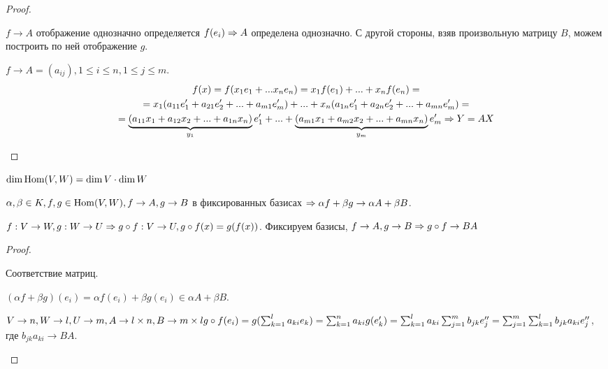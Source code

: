 \begin{proof}
	\begin{MyList}
		\item $f \to A$ отображение однозначно определяется $f(e_i) \Rightarrow A$ определена однозначно.
		С другой стороны, взяв произвольную матрицу $B$, можем построить по ней отображение $g$.

		\item $f \to A = (a_{ij}), 1 \leqslant i \leqslant n, 1 \leqslant j \leqslant m$.
		\begin{gather*}
			f(x) = f(x_1 e_1 + ... x_n e_n) = x_1 f(e_1) + ... + x_n f(e_n) = \\
			= x_1 (a_{11} e_1' + a_{21} e_2' + ... + a_{m1} e_m') + ... + x_n (a_{1n} e_1' + a_{2n} e_2' + ... + a_{mn} e_m') = \\
			= \underbrace{(a_{11} x_1 + a_{12} x_2 + ... + a_{1n} x_n)}_{y_1} e_1' + ... + \underbrace{(a_{m1} x_1 + a_{m2} x_2 + ... + a_{mn} x_n)}_{y_m} e_m' \Rightarrow Y = AX
		\end{gather*}
	\end{MyList}
\end{proof}

\begin{Cons}
	\begin{MyList}
		\item $\dim \operatorname{Hom}(V, W) = \dim V \cdot \dim W$
		\item $\alpha, \beta \in K, f, g \in \operatorname{Hom}(V, W), f \to A, g \to B$ в фиксированных базисах $\Rightarrow \alpha f + \beta g \to \alpha A + \beta B$.
		\item $f : V \to W, g : W \to U \Rightarrow g \circ f : V \to U, g \circ f(x) = g(f(x))$.
		Фиксируем базисы, $f \to A, g \to B \Rightarrow g \circ f \to BA$  
	\end{MyList}
\end{Cons}

\gdef\AuthorName{Дарья Гольденберг}

\begin{proof}
	\begin{MyList}
		\item Соответствие матриц.
		\item $(\alpha f  + \beta g) (e_i) = \alpha f (e_i) + \beta g (e_i) \in \alpha A + \beta B$.
		\item $ V \to n, W \to l, U \to m, A \to l \times n, B \to m\times l\\ g \circ f (e_i) = g (\sum_{k=1}^l a_{ki}e_k) = \sum_{k=1}^n a_{ki} g(e_k') = \sum_{k=1}^l a_{ki} \sum_{j =1}^m b_{jk} e_j'' = \sum_{j = 1}^m \sum_{k = 1}^l b_{jk} a_{ki} e_j''$, где $b_{jk} a_{ki} \to BA$.
	\end{MyList}
\end{proof}

